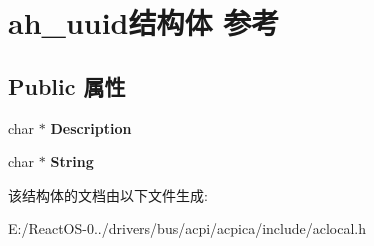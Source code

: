 \hypertarget{structah__uuid}{}\section{ah\+\_\+uuid结构体 参考}
\label{structah__uuid}
\subsection*{Public 属性}
\begin{DoxyCompactItemize}
\item 
\mbox{\label{structah__uuid_a9749ce04f94a2ac391b3aab11c833bfa}} 
char $\ast$ {\bfseries Description}
\item 
\mbox{\label{structah__uuid_aa6503d1fc541eafab04a0ee08724ba54}} 
char $\ast$ {\bfseries String}
\end{DoxyCompactItemize}


该结构体的文档由以下文件生成\+:\begin{DoxyCompactItemize}
\item 
E\+:/\+React\+O\+S-\/0../drivers/bus/acpi/acpica/include/aclocal.\+h\end{DoxyCompactItemize}
